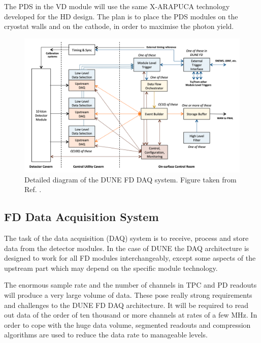 The PDS in the VD module will use the same X-ARAPUCA technology developed for the HD design. The plan is to place the PDS modules on the cryostat walls and on the cathode, in order to maximise the photon yield.


\begin{figure}[t]
	\centering
	\includegraphics[width=0.8\linewidth]{Images/DUNE/FD/DAQ_detailed2}
	\caption{Detailed diagram of the DUNE FD DAQ system. Figure taken from Ref. \cite{DUNE2020TDR4}.}
	\label{fig:daq1}
\end{figure}

\subsection{FD Data Acquisition System}

The task of the data acquisition (DAQ) system is to receive, process and store data from the detector modules. In the case of DUNE the DAQ architecture is designed to work for all FD modules interchangeably, except some aspects of the upstream part which may depend on the specific module technology.

The enormous sample rate and the number of channels in TPC and PD readouts will produce a very large volume of data. These pose really strong requirements and challenges to the DUNE FD DAQ architecture. It will be required to read out data of the order of ten thousand or more channels at rates of a few MHz. In order to cope with the huge data volume, segmented readouts and compression algorithms are used to reduce the data rate to manageable levels.

